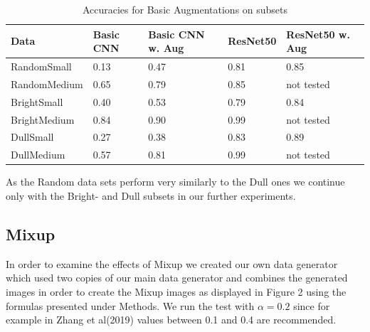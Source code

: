 \documentclass{article}
\begin{document}
\begin{table}[H]
	\caption{Accuracies for Basic Augmentations on subsets}
	\label{sample-table}
	\centering
	\begin{tabular}{lllll}
		\toprule
		Data &  Basic CNN & Basic CNN w. Aug & ResNet50 & ResNet50 w. Aug\\
		\midrule
		RandomSmall  & 0.13 & 0.47 & 0.81 & 0.85 \\
		RandomMedium & 0.65 & 0.79 & 0.85 & not tested     \\
		BrightSmall  & 0.40 & 0.53 & 0.79 & 0.84 \\
		BrightMedium & 0.84 & 0.90 & 0.99 & not tested     \\
		DullSmall    & 0.27 & 0.38 & 0.83 & 0.89 \\
		DullMedium   & 0.57 & 0.81 & 0.99 & not tested     \\
		\bottomrule
	\end{tabular}
\end{table}





As the Random data sets perform very similarly to the Dull ones we continue only with the Bright- and Dull subsets in our further experiments.

\subsection{Mixup}

In order to examine the effects of Mixup we created our own data generator which used two copies of our main data generator and combines the generated images in order to create the Mixup images as displayed in Figure 2 using the formulas presented under Methods. We run the test with $\alpha=0.2$ since for example in Zhang et al(2019) values between 0.1 and 0.4 are recommended.
\end{document}
